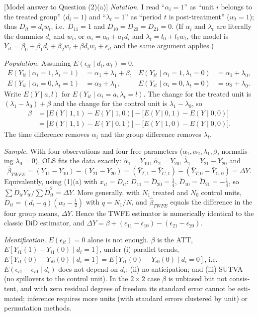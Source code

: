 \begin{english}[Model answer to Question (2)(a)]
\textit{Notation.} I read ``$\alpha_i=1$'' as ``unit $i$ belongs to the treated group'' ($d_i=1$) and ``$\lambda_t=1$'' as ``period $t$ is post-treatment'' ($w_t=1$); thus $D_{it}=d_iw_t$, i.e.\ $D_{11}=1$ and $D_{10}=D_{20}=D_{21}=0$. (If $\alpha_i$ and $\lambda_t$ are literally the dummies $d_i$ and $w_t$, or $\alpha_i=a_0+a_1d_i$ and $\lambda_t=l_0+l_1w_t$, the model is $Y_{it}=\beta_0+\beta_1d_i+\beta_2w_t+\beta d_iw_t+\epsilon_{it}$ and the same argument applies.)

\textit{Population.} Assuming $E(\epsilon_{it}\mid d_i,w_t)=0$,
\[
\begin{aligned}
E(Y_{it}\mid\alpha_i=1,\lambda_t=1)&=\alpha_1+\lambda_1+\beta, & E(Y_{it}\mid\alpha_i=1,\lambda_t=0)&=\alpha_1+\lambda_0,\\
E(Y_{it}\mid\alpha_i=0,\lambda_t=1)&=\alpha_2+\lambda_1, & E(Y_{it}\mid\alpha_i=0,\lambda_t=0)&=\alpha_2+\lambda_0.
\end{aligned}
\]
Write $E(Y\mid a,l)$ for $E(Y_{it}\mid\alpha_i=a,\lambda_t=l)$. The change for the treated unit is $(\lambda_1-\lambda_0)+\beta$ and the change for the control unit is $\lambda_1-\lambda_0$, so
\[
\begin{aligned}
\beta&=\bigl[E(Y\mid1,1)-E(Y\mid1,0)\bigr]-\bigl[E(Y\mid0,1)-E(Y\mid0,0)\bigr]\\
&=\bigl[E(Y\mid1,1)-E(Y\mid0,1)\bigr]-\bigl[E(Y\mid1,0)-E(Y\mid0,0)\bigr].
\end{aligned}
\]
The time difference removes $\alpha_i$ and the group difference removes $\lambda_t$.

\textit{Sample.} With four observations and four free parameters ($\alpha_1,\alpha_2,\lambda_1,\beta$, normalising $\lambda_0=0$), OLS fits the data exactly: $\hat\alpha_1=Y_{10}$, $\hat\alpha_2=Y_{20}$, $\hat\lambda_1=Y_{21}-Y_{20}$ and
\[
\hat\beta_{TWFE}=(Y_{11}-Y_{10})-(Y_{21}-Y_{20})=(\bar Y_{T,1}-\bar Y_{C,1})-(\bar Y_{T,0}-\bar Y_{C,0})=\Delta Y.
\]
Equivalently, using (1)(a) with $x_{it}=D_{it}$: $\ddot D_{11}=\ddot D_{20}=\frac14$, $\ddot D_{10}=\ddot D_{21}=-\frac14$, so $\sum\ddot D_{it}Y_{it}/\sum\ddot D_{it}^2=\Delta Y$. More generally, with $N_1$ treated and $N_0$ control units, $\ddot D_{it}=(d_i-q)(w_t-\frac12)$ with $q=N_1/N$, and $\hat\beta_{TWFE}$ equals the difference in the four group means, $\Delta Y$. Hence the TWFE estimator is numerically identical to the classic DiD estimator, and $\Delta Y=\beta+(\epsilon_{11}-\epsilon_{10})-(\epsilon_{21}-\epsilon_{20})$.

\textit{Identification.} $E(\epsilon_{it})=0$ alone is not enough. $\beta$ is the ATT, $E[Y_{i1}(1)-Y_{i1}(0)\mid d_i=1]$, under (i) parallel trends, $E[Y_{i1}(0)-Y_{i0}(0)\mid d_i=1]=E[Y_{i1}(0)-Y_{i0}(0)\mid d_i=0]$, i.e.\ $E(\epsilon_{i1}-\epsilon_{i0}\mid d_i)$ does not depend on $d_i$; (ii) no anticipation; and (iii) SUTVA (no spillovers to the control unit). In the $2\times2$ case $\hat\beta$ is unbiased but not consistent, and with zero residual degrees of freedom its standard error cannot be estimated; inference requires more units (with standard errors clustered by unit) or permutation methods.
\end{english}

